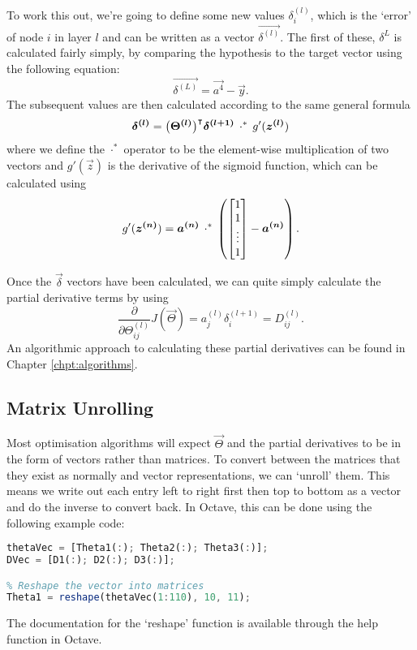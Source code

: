 To work this out, we're going to define some new values $\delta^{(l)}_i$, which is the `error' of node $i$ in layer $l$ and can be written as a vector $\vec{\delta^{(l)}}$.
The first of these, $\delta^{L}$ is calculated fairly simply, by comparing the hypothesis to the target vector using the following equation:
\begin{equation}
    \vec{\delta^{(L)}} = \vec{a^{4}} - \vec{y}.
\end{equation}
The subsequent values are then calculated according to the same general formula
\begin{equation}
    \vec{\delta^{(l)}} = \big(\vec{\Theta^{(l)}}\big)\transpose \vec{\delta^{(l+1)}} \hspace{0.2em}\cdot^*\hspace{0.2em} g'(\vec{z^{(l)}})
\end{equation}
where we define the $\cdot^*$ operator to be the element-wise multiplication of two vectors and $g'(\vec{z})$ is the derivative of the sigmoid function, which can be
calculated using
\begin{equation}
    g'(\vec{z^{(n)}}) = \vec{a^{(n)}} \hspace{0.2em}\cdot^*\hspace{0.2em} \left(\begin{bmatrix}
        1 \\ 1 \\ \vdots \\ 1
    \end{bmatrix} - \vec{a^{(n)}}\right).
\end{equation}

Once the $\vec{\delta}$ vectors have been calculated, we can quite simply calculate the partial derivative terms by using
\begin{equation}
    \frac{\partial}{\partial \Theta^{(l)}_{ij}} J(\vec{\Theta}) = a^{(l)}_j \delta^{(l+1)}_i = D^{(l)}_{ij}.
\end{equation}
An algorithmic approach to calculating these partial derivatives can be found in Chapter \ref{chpt:algorithms}.

\subsection{Matrix Unrolling}

Most optimisation algorithms will expect $\vec{\Theta}$ and the partial derivatives to be in the form of vectors rather than matrices.
To convert between the matrices that they exist as normally and vector representations, we can `unroll' them. This means we write out
each entry left to right first then top to bottom as a vector and do the inverse to convert back. In Octave, this can be done using
the following example code:

\begin{lstlisting}[language=Octave]
% Unroll the Theta and D matrices into vectors
thetaVec = [Theta1(:); Theta2(:); Theta3(:)];
DVec = [D1(:); D2(:); D3(:)];

% Reshape the vector into matrices
Theta1 = reshape(thetaVec(1:110), 10, 11);
\end{lstlisting}

The documentation for the `reshape' function is available through the help function in Octave.